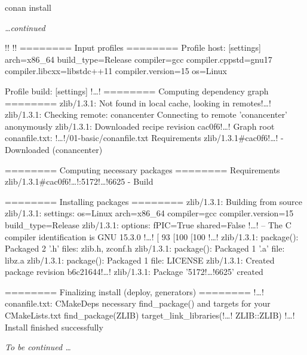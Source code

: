 \documentclass[compress, 8pt, aspectratio=169]{beamer}
\begin{document}
\begin{frame}[fragile]{conan install}

  \textit{\dots continued}\bigbreak

  {\small
  \begin{terminalwindow}[!!][minted options={escapeinside=!!, firstline=21, lastline=40}]
!!
!!
======== Input profiles ========
Profile host:
[settings]
arch=x86_64
build_type=Release
compiler=gcc
compiler.cppstd=gnu17
compiler.libcxx=libstdc++11
compiler.version=15
os=Linux

Profile build:
[settings]
!\dots!
======== Computing dependency graph ========
zlib/1.3.1: Not found in local cache, looking in remotes!\dots!
zlib/1.3.1: Checking remote: conancenter
Connecting to remote 'conancenter' anonymously
zlib/1.3.1: Downloaded recipe revision cac0f6!\dots!
Graph root
    conanfile.txt: !\dots!/01-basic/conanfile.txt
Requirements
    zlib/1.3.1#cac0f6!\dots! - Downloaded (conancenter)

======== Computing necessary packages ========
Requirements
    zlib/1.3.1#cac0f6!\dots!:5172!\dots!6625 - Build

======== Installing packages ========
zlib/1.3.1: Building from source
zlib/1.3.1: settings: os=Linux arch=x86_64 compiler=gcc compiler.version=15 build_type=Release
zlib/1.3.1: options: fPIC=True shared=False
!\dots!
-- The C compiler identification is GNU 15.3.0
!\dots!
[ 93%
[100%
[100%
!\dots!
zlib/1.3.1: package(): Packaged 2 '.h' files: zlib.h, zconf.h
zlib/1.3.1: package(): Packaged 1 '.a' file: libz.a
zlib/1.3.1: package(): Packaged 1 file: LICENSE
zlib/1.3.1: Created package revision b6c21644!\dots!
zlib/1.3.1: Package '5172!\dots!6625' created

======== Finalizing install (deploy, generators) ========
!\dots!
conanfile.txt: CMakeDeps necessary find_package() and targets for your CMakeLists.txt
    find_package(ZLIB)
    target_link_libraries(!\dots! ZLIB::ZLIB)
!\dots!
Install finished successfully
  \end{terminalwindow}
  }

  \textit{To be continued \dots}

\end{frame}
\end{document}
